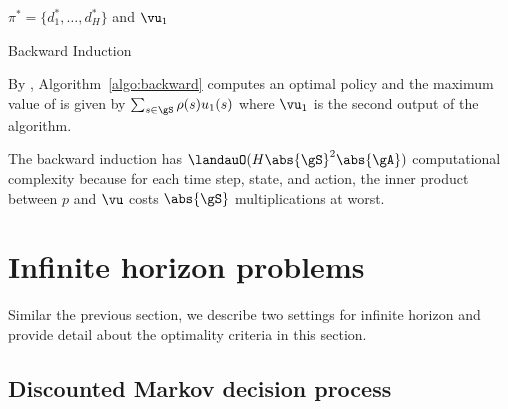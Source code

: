 \begin{algorithm}[ht]
    \DontPrintSemicolon
    \BlankLine
    \Return $\pi^*=\{d_1^*,\dots,d_H^*\}$ and $\vu_1$
    \caption{Backward Induction}
    \label{algo:backward}
\end{algorithm}
By \cite[Theorem~4.5.1]{puterman2014markov}, Algorithm~\ref{algo:backward} computes an optimal policy and the maximum value of  is given by $\sum_{s\in\gS}\rho(s)u_{1}(s)$ where $\vu_1$ is the second output of the algorithm.

The backward induction has $\landauO(H\abs{\gS}^2\abs{\gA})$ computational complexity because for each time step, state, and action, the inner product between $p$ and $\vu$ costs $\abs{\gS}$ multiplications at worst.

\section{Infinite horizon problems}

Similar the previous section, we describe two settings for infinite horizon and provide detail about the optimality criteria in this section.

\subsection{Discounted Markov decision process}

